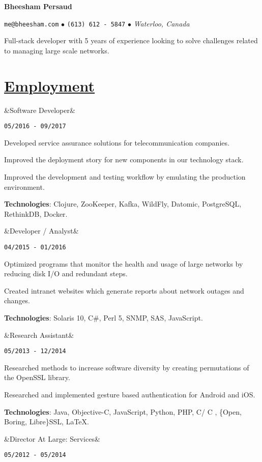 \documentclass[11pt]{article} %
\newcommand{\heading}[1]{
    \section*{\uline{\hfill #1 }} %
}
\newcommand{\squish}{
\setlength{\itemsep}{0.2pt}
    \setlength{\parskip}{0pt} %
    \setlength{\parsep}{0.2pt}
}
\newcommand{\when}[1]{ %
    \hfill \texttt{#1}
}
\newcommand{\experience}[3]{ %
    \ifx&#2&
\item[{#1}]
    \else
\item[{#1}, \emph{#2}]
    \fi
    \when{#3}
}
\newcommand{\contact}[3]{
    \centerline{ \large \texttt{#1} $\bullet$ \texttt{#2} $\bullet$ \emph{#3} }
    \vspace{0.1in}
}
\newcommand{\technologies}[1]{
    {\small \textbf{Technologies}: #1.}
}
\newcommand{\CPP}{
    C\hspace{-.05em}\raisebox{.4ex}{\tiny\bf +}\hspace{-.10em}\raisebox{.4ex}{\tiny\bf +}
}
\begin{document}
\centerline{{\huge \bf Bheesham Persaud}}
\bigskip

\contact{me@bheesham.com}
        {(613) 612 - 5847}
        {Waterloo, Canada}

Full-stack developer with 5 years of experience looking to solve challenges
related to managing large scale networks.

\heading{Employment}%

\begin{description}
        \squish

        \experience{CENX}
                   {Software Developer}
                   {05/2016 - 09/2017}

        Developed service assurance solutions for telecommunication companies.

        Improved the deployment story for new components in our technology
        stack.

        Improved the development and testing workflow by emulating the
        production environment.

        \technologies{Clojure, ZooKeeper, Kafka, WildFly, Datomic, PostgreSQL,
        RethinkDB, Docker}

        \experience{Shared Services Canada}
                   {Developer / Analyst}
                   {04/2015 - 01/2016}

           Optimized programs that monitor the health and usage of large
           networks by reducing disk I/O and redundant steps.
           
           Created intranet websites which generate reports about network
           outages and changes.
           
           \technologies{Solaris 10, C\#, Perl 5, SNMP, SAS, JavaScript}

        \experience{Carleton University}
                   {Research Assistant}
                   {05/2013 - 12/2014}

            Researched methods to increase software diversity by creating
            permutations of the OpenSSL library.

            Researched and implemented gesture based authentication for Android
            and iOS.
            
            \technologies{Java, Objective-C, JavaScript, Python, PHP, C/\CPP,
            \{Open, Boring, Libre\}SSL, \LaTeX}

        \experience{Carleton Computer Science Society}
                   {Director At Large: Services}
                   {05/2012 - 05/2014}


\end{description}
\end{document}

